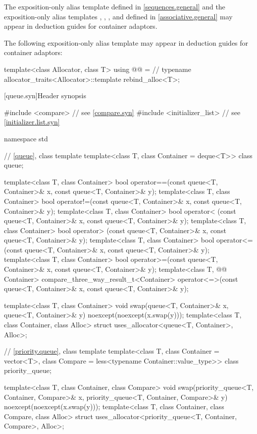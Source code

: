 \pnum
The exposition-only alias template 
defined in \ref{sequences.general} and
the exposition-only alias templates , ,
, and 
defined in \ref{associative.general}
may appear in deduction guides for container adaptors.

\pnum
The following exposition-only alias template
may appear in deduction guides for container adaptors:
\begin{codeblock}
template<class Allocator, class T>
  using @@ =                      // \expos
    typename allocator_traits<Allocator>::template rebind_alloc<T>;
\end{codeblock}

[queue.syn]{Header  synopsis}

\begin{codeblock}
#include <compare>              // see \ref{compare.syn}
#include <initializer_list>     // see \ref{initializer.list.syn}

namespace std {
  // \ref{queue}, class template 
  template<class T, class Container = deque<T>> class queue;

  template<class T, class Container>
    bool operator==(const queue<T, Container>& x, const queue<T, Container>& y);
  template<class T, class Container>
    bool operator!=(const queue<T, Container>& x, const queue<T, Container>& y);
  template<class T, class Container>
    bool operator< (const queue<T, Container>& x, const queue<T, Container>& y);
  template<class T, class Container>
    bool operator> (const queue<T, Container>& x, const queue<T, Container>& y);
  template<class T, class Container>
    bool operator<=(const queue<T, Container>& x, const queue<T, Container>& y);
  template<class T, class Container>
    bool operator>=(const queue<T, Container>& x, const queue<T, Container>& y);
  template<class T, @@ Container>
    compare_three_way_result_t<Container>
      operator<=>(const queue<T, Container>& x, const queue<T, Container>& y);

  template<class T, class Container>
    void swap(queue<T, Container>& x, queue<T, Container>& y) noexcept(noexcept(x.swap(y)));
  template<class T, class Container, class Alloc>
    struct uses_allocator<queue<T, Container>, Alloc>;

  // \ref{priority.queue}, class template 
  template<class T, class Container = vector<T>,
           class Compare = less<typename Container::value_type>>
    class priority_queue;

  template<class T, class Container, class Compare>
    void swap(priority_queue<T, Container, Compare>& x,
              priority_queue<T, Container, Compare>& y) noexcept(noexcept(x.swap(y)));
  template<class T, class Container, class Compare, class Alloc>
    struct uses_allocator<priority_queue<T, Container, Compare>, Alloc>;
}
\end{codeblock}

